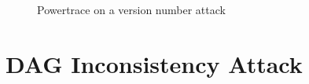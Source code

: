 \documentclass[11pt]{report}
\begin{document}
\begin{figure}[ht!]
    \centering
    \caption{Powertrace on a version number attack}
    \label{fig:power}
\end{figure}




\section{DAG Inconsistency Attack}
\end{document}
